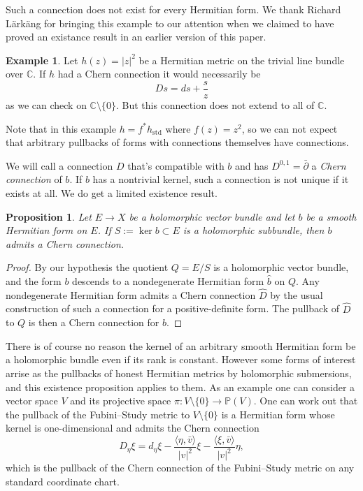 \documentclass[10pt,a4paper]{amsart}
\newtheorem{prop}[theo]{Proposition}
\theoremstyle{definition}
\newtheorem{exam}[theo]{Example}
\newcommand{\kk}[1]{\mathbb{#1}}
\def\<{\langle}
\def\>{\rangle}
\begin{document}
Such a connection does not exist for every Hermitian form.
We thank Richard L\"ark\"ang for bringing this example to our attention
when we claimed to have proved an existance result in an earlier version
of this paper.

\begin{exam}
Let $h(z) = |z|^2$ be a Hermitian metric on the trivial line bundle over $\kk
C$.
If $h$ had a Chern connection it would necessarily be
$$
D s = ds + \frac{s}{z}
$$
as we can check on $\kk C \setminus \{0\}$.
But this connection does not extend to all of $\kk C$.
\end{exam}

Note that in this example $h = f^* h_{\text{std}}$ where $f(z) = z^2$,
so we can not expect that arbitrary pullbacks of forms with connections
themselves have connections.

We will call a connection $D$ that's compatible with $b$ and has $D^{0,1} =
\bar\partial$ a \emph{Chern connection} of $b$. If $b$ has a nontrivial kernel,
such a connection is not unique if it exists at all.
We do get a limited existence result.


\begin{prop}
Let $E \to X$ be a holomorphic vector bundle and let $b$ be a smooth Hermitian
form on $E$.
If $S := \ker b \subset E$ is a holomorphic subbundle, then $b$ admits a Chern
connection.
\end{prop}


\begin{proof}
By our hypothesis the quotient $Q = E / S$ is a holomorphic vector bundle,
and the form $b$ descends to a nondegenerate Hermitian form $\hat b$ on $Q$.
Any nondegenerate Hermitian form admits a Chern connection $\widehat D$ by the
usual construction of such a connection for a positive-definite form.
The pullback of $\widehat D$ to $Q$ is then a Chern connection for $b$.
\end{proof}

There is of course no reason the kernel of an arbitrary smooth Hermitian form
be a holomorphic bundle even if its rank is constant.
However some forms of interest arrise as the pullbacks of honest Hermitian
metrics by holomorphic submersions, and this existence proposition applies to
them.
As an example one can consider a vector space $V$ and its projective space
$\pi : V \setminus \{0\} \to \kk P(V)$.
One can work out that the pullback of the Fubini--Study metric to $V \setminus
\{0\}$ is a Hermitian form whose kernel is one-dimensional and admits the
Chern connection
$$
D_\eta \xi = d_\eta \xi
- \frac{\<\eta, \bar v\>}{|v|^2} \xi
- \frac{\<\xi, \bar v\>}{|v|^2} \eta,
$$
which is the pullback of the Chern connection of the Fubini--Study metric
on any standard coordinate chart.
\end{document}
